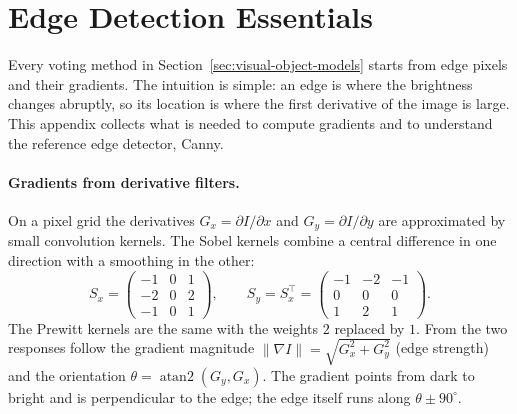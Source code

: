 \section{Edge Detection Essentials}
\label{app:edges}

Every voting method in Section~\ref{sec:visual-object-models} starts from edge
pixels and their gradients. The intuition is simple: an edge is where the
brightness changes abruptly, so its location is where the first derivative of
the image is large. This appendix collects what is needed to compute gradients
and to understand the reference edge detector, Canny.

\paragraph{Gradients from derivative filters.}
On a pixel grid the derivatives $G_x = \partial I/\partial x$ and
$G_y = \partial I/\partial y$ are approximated by small convolution kernels. The
Sobel kernels combine a central difference in one direction with a smoothing
in the other:
\begin{equation}
  S_x = \begin{pmatrix} -1 & 0 & 1\\ -2 & 0 & 2\\ -1 & 0 & 1 \end{pmatrix},
  \qquad
  S_y = S_x^\top = \begin{pmatrix} -1 & -2 & -1\\ 0 & 0 & 0\\ 1 & 2 & 1
  \end{pmatrix}.
\end{equation}
\noindent
The Prewitt kernels are the same with the weights $2$ replaced by $1$. From the
two responses follow the gradient magnitude
$\lVert\nabla I\rVert = \sqrt{G_x^2 + G_y^2}$ (edge strength) and the orientation
$\theta = \operatorname{atan2}(G_y,G_x)$. The gradient points from dark to
bright and is perpendicular to the edge; the edge itself runs along
$\theta \pm 90^\circ$.

